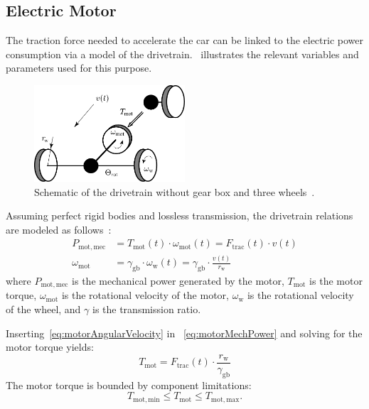 \subsection{Electric Motor}
\label{sec:modelMotor}
The traction force needed to accelerate the car can be linked to the electric power consumption via a model of the drivetrain.~ illustrates the relevant variables and parameters used for this purpose.
\begin{figure}[htbp]
	\centering
	\includegraphics[width=0.5\textwidth, height=0.3\textwidth]{img/drivetrain/drivetrain3wheels.pdf}
	\caption{Schematic of the drivetrain without gear box and three wheels~\cite{SysMod:2022misc}.}
	\label{fig:drivetrain}
\end{figure}

Assuming perfect rigid bodies and lossless transmission, the drivetrain relations are modeled as follows~\cite{vps:2007book}:
\begin{align}
	P_\mathrm{mot,mec} &= T_\mathrm{mot}(t) \cdot \omega_\mathrm{mot}(t) = F_\mathrm{trac}(t) \cdot v(t) \label{eq:motorMechPower}\\
	\omega_\mathrm{mot} &= \gamma_\mathrm{gb} \cdot \omega_\mathrm{w}(t) = \gamma_\mathrm{gb} \cdot \frac{v(t)}{r_\mathrm{w}} \label{eq:motorAngularVelocity}
\end{align}
where $P_\mathrm{mot,mec}$ is the mechanical power generated by the motor, $T_\mathrm{mot}$ is the motor torque, $\omega_\mathrm{mot}$ is the rotational velocity of the motor, $\omega_\mathrm{w}$ is the rotational velocity of the wheel, and $\gamma$ is the transmission ratio.

Inserting~\cref{eq:motorAngularVelocity} in ~\cref{eq:motorMechPower} and solving for the motor torque yields:
\begin{equation}
	T_\mathrm{mot} = F_\mathrm{trac}(t) \cdot \frac{r_\mathrm{w}}{\gamma_\mathrm{gb}}
\end{equation}
The motor torque is bounded by component limitations:
\begin{equation}
	T_\mathrm{mot,min} \leq T_\mathrm{mot} \leq T_\mathrm{mot,max}.
\end{equation}

